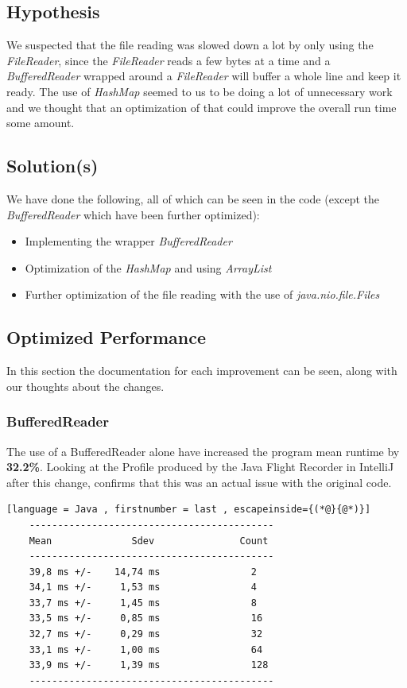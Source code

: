 \vspace{0.5cm}
\subsection{Hypothesis}
\label{sec:2.4}
We suspected that the file reading was slowed down a lot by only using the \emph{FileReader}, since the \emph{FileReader} reads a few bytes at a time and a \emph{BufferedReader} wrapped around a \emph{FileReader} will buffer a whole line and keep it ready. 
The use of \emph{HashMap} seemed to us to be doing a lot of unnecessary work and we thought that an optimization of that could improve the overall run time some amount.  

\vspace{0.5cm}
\subsection{Solution(s)}
\label{sec:2.5}

We have done the following, all of which can be seen in the code (except the \emph{BufferedReader} which have been further optimized):
\begin{itemize}
    \item Implementing the wrapper \emph{BufferedReader}
    \item Optimization of the \emph{HashMap} and using \emph{ArrayList}
    \item Further optimization of the file reading with the use of \emph{java.nio.file.Files}
\end{itemize}


\subsection{Optimized Performance}
\label{sec:2.6}
In this section the documentation for each improvement can be seen, along with our thoughts about the changes. 
\subsubsection{BufferedReader}
\label{sec:2.6.1}
The use of a BufferedReader alone have increased the program mean runtime by \textbf{32.2\%}. Looking at the Profile produced by the Java Flight Recorder in IntelliJ after this change, confirms that this was an actual issue with the original code.
\begin{lstlisting}[language = Java , firstnumber = last , escapeinside={(*@}{@*)}]
    -------------------------------------------
    Mean              Sdev               Count
    -------------------------------------------
    39,8 ms +/-    14,74 ms                2
    34,1 ms +/-     1,53 ms                4
    33,7 ms +/-     1,45 ms                8
    33,5 ms +/-     0,85 ms                16
    32,7 ms +/-     0,29 ms                32
    33,1 ms +/-     1,00 ms                64
    33,9 ms +/-     1,39 ms                128
    -------------------------------------------
\end{lstlisting}

